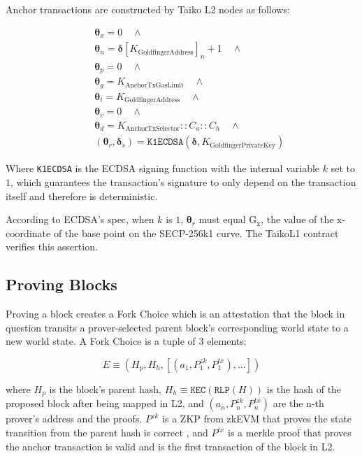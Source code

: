 \documentclass[9pt,oneside]{amsart}
\begin{document}
\begin{multicols}{2}
Anchor transactions are constructed by Taiko L2 nodes as follows:

\begin{eqnarray}
& & \boldsymbol{\theta}_x = 0 \quad \wedge \\
\nonumber& & \boldsymbol{\theta}_n = \boldsymbol{\delta}[K_{\mathrm{GoldfingerAddress}}]_n + 1 \quad \wedge \\
\nonumber& & \boldsymbol{\theta}_p = 0 \quad \wedge \\
\nonumber& & \boldsymbol{\theta}_g = K_{\mathrm{AnchorTxGasLimit}} \quad \wedge \\
\nonumber& & \boldsymbol{\theta}_t = K_{\mathrm{GoldfingerAddress}} \quad \wedge  \\
\nonumber& & \boldsymbol{\theta}_v = 0 \quad \wedge  \\
\nonumber& & \boldsymbol{\theta}_d = K_{\mathrm{AnchorTxSelector}}::C_a::C_h \quad \wedge  \\
\nonumber& & (\boldsymbol{\theta}_r,\boldsymbol{\delta}_s) = \texttt{K1ECDSA}(\boldsymbol{\delta}, K_{\mathrm{GoldfingerPrivateKey}})
\end{eqnarray}

Where \texttt{K1ECDSA} is the ECDSA\cite{ecdsa} signing function with the internal variable $k$ set to $1$, which guarantees the transaction's signature to only depend on the transaction itself and therefore is deterministic\cite{ecdsak}.

According to ECDSA's spec, when $k$ is $1$, $\boldsymbol{\theta}_r$ must equal $\mathrm{G_x}$, the value of the x-coordinate of the base point on the SECP-256k1 curve. The TaikoL1 contract verifies this assertion.





\subsection{Proving Blocks} \label{sec:proving}

Proving a block creates a Fork Choice which is an attestation that the block in question transits a prover-selected parent block's corresponding world state to a new world state. A Fork Choice is a tuple of 3 elements:

\begin{equation}
E \equiv (H_p, H_h, [(a_1, P^{zk}_1, P^{tx}_1),...])
\end{equation}

where $H_p$ is the block's parent hash, $H_h \equiv \texttt{KEC}(\texttt{RLP}(H))$ is the hash of the proposed block after being mapped in L2, and $(a_n, P^{zk}_n, P^{tx}_n)$ are the n-th prover's address and the proofs. $P^{zk}$ is a ZKP from zkEVM that proves the state transition from the parent hash is correct , and $P^{tx}$ is a merkle proof that proves the anchor transaction is valid and is the first transaction of the block in L2.


\end{multicols}
\end{document}
